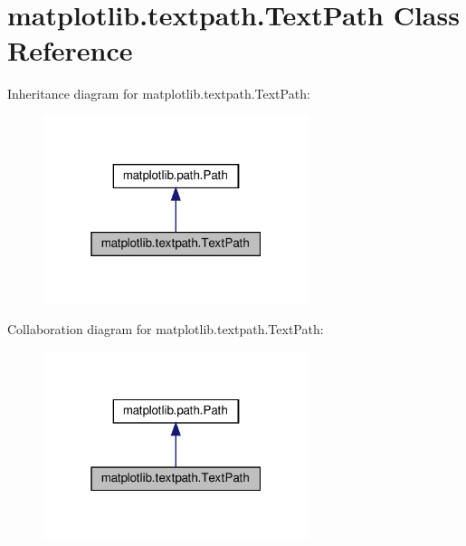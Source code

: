 \hypertarget{classmatplotlib_1_1textpath_1_1TextPath}{}\section{matplotlib.\+textpath.\+Text\+Path Class Reference}
\label{classmatplotlib_1_1textpath_1_1TextPath}


Inheritance diagram for matplotlib.\+textpath.\+Text\+Path\+:
\nopagebreak
\begin{figure}[H]
\begin{center}
\leavevmode
\includegraphics[width=220pt]{classmatplotlib_1_1textpath_1_1TextPath__inherit__graph}
\end{center}
\end{figure}


Collaboration diagram for matplotlib.\+textpath.\+Text\+Path\+:
\nopagebreak
\begin{figure}[H]
\begin{center}
\leavevmode
\includegraphics[width=220pt]{classmatplotlib_1_1textpath_1_1TextPath__coll__graph}
\end{center}
\end{figure}

